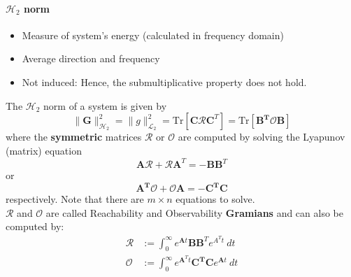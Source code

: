 \paragraph[H2-induced Norm]{$\mathcal{H}_2$ norm}
\begin{itemize}
    \item Measure of system's energy (calculated in frequency domain)
    \item Average direction and frequency
    \item Not induced: Hence, the submultiplicative property does not hold.
\end{itemize}


The $\mathcal{H}_2$ norm of a system is given by
\begin{equation*}
    \|\mathbf{G}\|_{\mathcal{H}_2}^2=\|g\|_{\mathcal{L}_2}^2=\mathrm{Tr}\left[\mathbf{C\mathcal{R}C}^{T}\right]=\mathrm{Tr}\left[\mathbf{B^{T}\mathcal{O}B}\right]
\end{equation*}
where the \textbf{symmetric} matrices $\mathbf{\mathcal{R}}$ or $\mathbf{\mathcal{O}}$ are computed by solving the Lyapunov (matrix) equation
\begin{equation*}
    \mathbf{ A\mathcal{R}}+\mathbf{\mathcal{R}A}^{T}=-\mathbf{BB}^{T}
\end{equation*}
or\begin{equation*}
    \mathbf{A^{T}\mathcal{O}}+\mathbf{\mathcal{O}A}=-\mathbf{C^{T}C}
\end{equation*}
respectively. Note that there are $m\times n$ equations to solve.\\
$\mathbf{\mathcal{R}}$ and $\mathbf{\mathcal{O}}$ are called Reachability and Observability \textbf{Gramians} and can also be computed by:
\begin{align*}
    \mathbf{\mathcal{R}} & :=\int_{0}^{\infty}e^{\mathbf{A}t}\mathbf{BB}^{T}e^{A^{T}t}\mathrm{~}dt          \\
    \mathbf{\mathcal{O}} & :=\int_{0}^{\infty}e^{\mathbf{A}^{T}t}\mathbf{C^{T}C}e^{\mathbf{A}t}\mathrm{~}dt
\end{align*}


